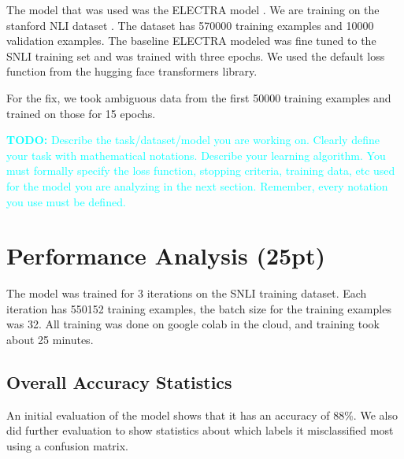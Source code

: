 \documentclass[twocolumn]{article}
\newcommand{\todo}[1]{\textcolor{cyan}{\textbf{TODO:} #1}}
\begin{document}
The model that was used was the ELECTRA model \cite{clark2020electra}. We are
training  on the stanford NLI dataset \cite{bowman2015large}. The dataset has
570000 training examples and 10000 validation examples. The baseline ELECTRA
modeled was fine tuned to the SNLI training set and was trained with three
epochs. We used the default loss function from the hugging face transformers
library. 

For the fix, we took ambiguous data from the first 50000 training examples and
trained on those for 15 epochs.

\todo{Describe the task/dataset/model you are working on. Clearly define your
task with mathematical notations. Describe your learning algorithm. You must
formally specify the loss function, stopping criteria, training data, etc used
for the model you are analyzing in the next section. Remember, every notation
you use must be defined.}

\section{Performance Analysis (25pt)}

The model was trained for 3 iterations on the SNLI training dataset. Each
iteration has 550152 training examples, the batch size for the training examples
was 32. All training was done on google colab in the cloud, and training took
about 25 minutes.

\subsection*{Overall Accuracy Statistics}

An initial evaluation of the model shows that it has an accuracy of 88\%. We
also did further evaluation to show statistics about which labels it
misclassified most using a confusion matrix.
\end{document}
